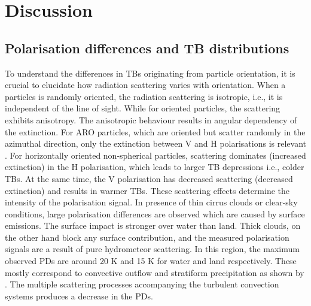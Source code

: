 \documentclass[amt, manuscript]{copernicus}
\begin{document}
\section{Discussion}

\subsection{Polarisation differences and TB distributions}
%
To understand the differences in TBs originating from particle orientation, it is crucial to elucidate how radiation scattering varies with orientation. When a particles is randomly oriented, the radiation scattering is isotropic, i.e., it is independent of the line of sight. While for oriented particles, the scattering exhibits anisotropy. The anisotropic behaviour results in angular dependency of the extinction. For ARO particles, which are oriented but scatter randomly in the azimuthal direction, only the extinction between V  and H polarisations is relevant \citep{brath:micro:20, barlakas:intro:21}. For horizontally oriented non-spherical particles, scattering dominates (increased extinction) in the H polarisation, which leads to larger TB depressions i.e., colder TBs. At the same time, the V polarisation has decreased scattering (decreased extinction) and results in warmer TBs. These scattering effects determine the intensity of the polarisation signal. In presence of thin cirrus clouds or clear-sky conditions, large polarisation differences are observed which are caused by surface emissions. The surface impact is stronger over water than land. Thick clouds, on the other hand block any surface contribution, and the measured polarisation signals are a result of pure hydrometeor scattering. In this region, the maximum observed PDs  are around 20\,\,K and 15\,\,K for  water and land respectively. These mostly correspond to convective outflow and stratiform precipitation as shown by \citet{gong:micro:17}. The multiple scattering processes accompanying the turbulent convection systems produces a decrease in the PDs.
\end{document}
